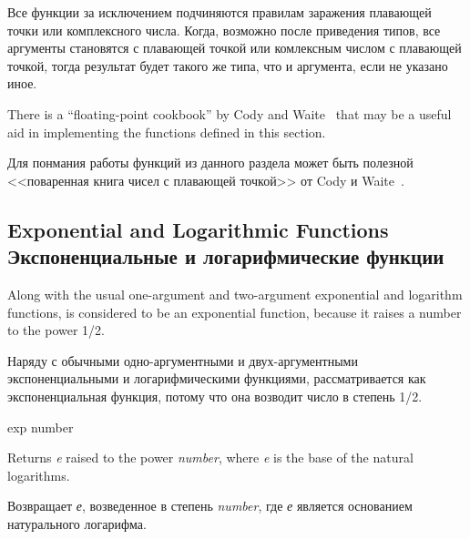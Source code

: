 Все функции за исключением  подчиняются правилам заражения плавающей
точки или комплексного числа. Когда, возможно после приведения типов, все
аргументы становятся с плавающей точкой или комлексным числом с плавающей
точкой, тогда результат будет такого же типа, что и аргумента, если не указано
иное.

\beforenoterule
\begin{implementation}
There is a ``floating-point cookbook'' by
Cody and Waite~\cite{CODY-AND-WAITE} that may be a useful aid
in implementing the functions defined in this section.
\end{implementation}
\afternoterule

\beforenoterule
\begin{implementation}
Для понмания работы функций из данного раздела может быть полезной <<поваренная
книга чисел с плавающей точкой>> от Cody и Waite~\cite{CODY-AND-WAITE}.
\end{implementation}
\afternoterule

\subsection{Exponential and Logarithmic Functions Экспоненциальные и
  логарифмические функции}

Along with the usual one-argument and two-argument exponential and
logarithm functions,  is considered to be an exponential
function, because it raises a number to the power 1/2.

Наряду с обычными одно-аргументными и двух-аргументными экспоненциальными и
логарифмическими функциями,  рассматривается как экспоненциальная
функция, потому что она возводит число в степень 1/2.

\begin{defun}[Function]
exp number

Returns \emph{e} raised to the power \emph{number},
where \emph{e} is the base of the natural logarithms.

Возвращает \emph{е}, возведенное в степень \emph{number},
где \emph{е} является основанием натурального логарифма.
\end{defun}

